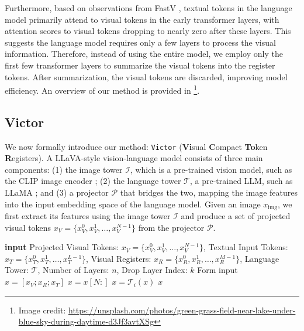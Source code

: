 \documentclass{article} %
\begin{document}
Furthermore, based on observations from FastV \citep{chen2024image}, textual tokens in the language model primarily attend to visual tokens in the early transformer layers, with attention scores to visual tokens dropping to nearly zero after these layers. This suggests the language model requires only a few layers to process the visual information. Therefore, instead of using the entire model, we employ only the first few transformer layers to summarize the visual tokens into the register tokens. After summarization, the visual tokens are discarded, improving model efficiency. An overview of our method is provided in \footnote{Image credit: \url{https://unsplash.com/photos/green-grass-field-near-lake-under-blue-sky-during-daytime-d3Jf3avtXSg}}.

\subsection{Victor}
We now formally introduce our method: \texttt{Victor} (\textbf{Vi}sual \textbf{C}ompact \textbf{To}ken \textbf{R}egisters). A LLaVA-style vision-language model consists of three main components: (1) the image tower $\mathcal{I}$, which is a pre-trained vision model, such as the CLIP image encoder \citep{radford2021learning}; (2) the language tower $\mathcal{T}$, a pre-trained LLM, such as LLaMA \citep{touvron2023llama}; and (3) a projector $\mathcal{P}$ that bridges the two, mapping the image features into the input embedding space of the language model. Given an image $x_{\text{img}}$, we first extract its features using the image tower $\mathcal{I}$ and produce a set of projected visual tokens $x_V = \{x_V^0, x_V^1, \ldots, x_V^{N-1}\}$ from the projector $\mathcal{P}$.

\begin{algorithm}[!t]
\caption{\texttt{Victor} - \textbf{Vi}sual \textbf{C}ompact \textbf{To}ken \textbf{R}egisters}
\label{alg:algorithm}
\begin{algorithmic}[1]
\State \textbf{input} Projected Visual Tokens: $x_V = \{x_V^0, x_V^1, \ldots, x_V^{N-1}\}$, Textual Input Tokens: $x_T = \{x_T^0, x_T^1, \ldots, x_T^{L-1}\}$, Visual Registers: $x_R = \{x_R^0, x_R^1, \ldots, x_R^{M-1}\}$, Language Tower: $\mathcal{T}$, Number of Layers: $n$, Drop Layer Index: $k$
\State Form input $x = [x_V; x_R; x_T]$ 
        \State $x = x[N:]$ 
    \EndIf
    \State $x = \mathcal{T}_{i}(x)$
\EndFor
\State \Return $x$
\end{algorithmic}
\end{algorithm}
\end{document}
